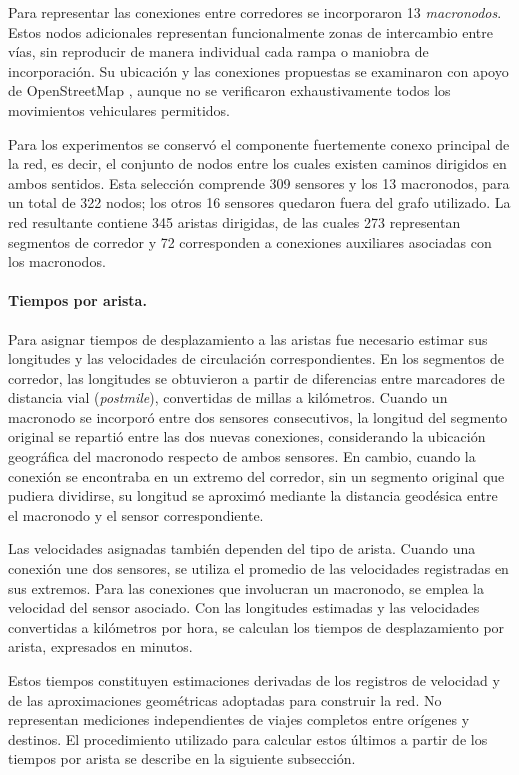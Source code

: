 \documentclass[letterpaper,11pt]{article}
\begin{document}
Para representar las conexiones entre corredores se incorporaron 13 \emph{macronodos}. Estos nodos adicionales representan funcionalmente zonas de intercambio entre vías, sin reproducir de manera individual cada rampa o maniobra de incorporación. Su ubicación y las conexiones propuestas se examinaron con apoyo de OpenStreetMap \parencite{osm}, aunque no se verificaron exhaustivamente todos los movimientos vehiculares permitidos.

Para los experimentos se conservó el componente fuertemente conexo principal de la red, es decir, el conjunto de nodos entre los cuales existen caminos dirigidos en ambos sentidos. Esta selección comprende 309 sensores y los 13 macronodos, para un total de 322 nodos; los otros 16 sensores quedaron fuera del grafo utilizado. La red resultante contiene 345 aristas dirigidas, de las cuales 273 representan segmentos de corredor y 72 corresponden a conexiones auxiliares asociadas con los macronodos.

\paragraph{Tiempos por arista.}
Para asignar tiempos de desplazamiento a las aristas fue necesario estimar sus longitudes y las velocidades de circulación correspondientes. En los segmentos de corredor, las longitudes se obtuvieron a partir de diferencias entre marcadores de distancia vial (\emph{postmile}), convertidas de millas a kilómetros. Cuando un macronodo se incorporó entre dos sensores consecutivos, la longitud del segmento original se repartió entre las dos nuevas conexiones, considerando la ubicación geográfica del macronodo respecto de ambos sensores. En cambio, cuando la conexión se encontraba en un extremo del corredor, sin un segmento original que pudiera dividirse, su longitud se aproximó mediante la distancia geodésica entre el macronodo y el sensor correspondiente.

Las velocidades asignadas también dependen del tipo de arista. Cuando una conexión une dos sensores, se utiliza el promedio de las velocidades registradas en sus extremos. Para las conexiones que involucran un macronodo, se emplea la velocidad del sensor asociado. Con las longitudes estimadas y las velocidades convertidas a kilómetros por hora, se calculan los tiempos de desplazamiento por arista, expresados en minutos.

Estos tiempos constituyen estimaciones derivadas de los registros de velocidad y de las aproximaciones geométricas adoptadas para construir la red. No representan mediciones independientes de viajes completos entre orígenes y destinos. El procedimiento utilizado para calcular estos últimos a partir de los tiempos por arista se describe en la siguiente subsección.
\end{document}
